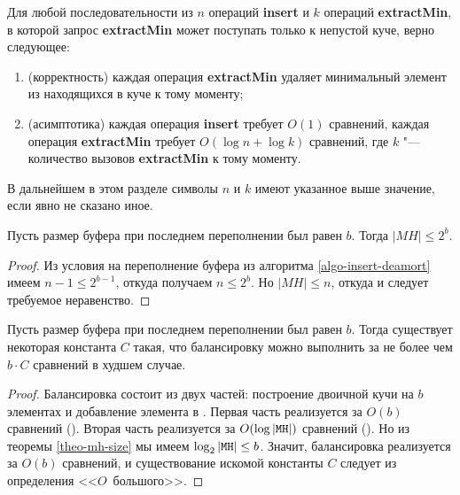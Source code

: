 \begin{theorem} \label{theo-fast-correct}
Для любой последовательности из
$n$ операций \textbf{insert} и $k$ операций \textbf{extractMin},
в которой запрос \textbf{extractMin} может поступать только к непустой
куче, верно следующее:
\begin{enumerate}
\item (корректность) каждая операция \textbf{extractMin} удаляет минимальный элемент
из находящихся в куче к тому моменту;
\item (асимптотика) каждая операция \textbf{insert} требует $O(1)$ сравнений,
каждая операция \textbf{extractMin} требует $O(\log n + \log k)$ сравнений,
где $k$ "--- количество вызовов \textbf{extractMin} к тому моменту.
\end{enumerate}
\end{theorem}

В дальнейшем в этом разделе символы $n$ и $k$ имеют указанное выше значение,
если явно не сказано иное.

\begin{lem} \label{theo-mh-size}
Пусть размер буфера при последнем переполнении был равен $b$. Тогда $|MH| \leq 2^b$.
\end{lem}
\begin{proof}
Из условия на переполнение буфера из алгоритма \ref{algo-insert-deamort} имеем
$n-1 \leq 2^{b-1}$, откуда получаем $n \leq 2^b$. Но $|MH| \leq n$, откуда
и следует требуемое неравенство.
\end{proof}

\begin{lem}\label{theo-balancing-constant}
Пусть размер буфера при последнем переполнении был равен $b$.
Тогда существует некоторая константа $C$ такая,
что балансировку можно выполнить за не более чем $b\cdot C$ сравнений в худшем случае.
\end{lem}
\begin{proof}
Балансировка состоит из двух частей: построение двоичной кучи на $b$ элементах
и добавление элемента в \MH. Первая часть реализуется за $O(b)$ сравнений (\cite{Cormen}).
Вторая часть реализуется за $O(\log |\texttt{MH}|)$ сравнений (\cite{Cormen}). Но из
теоремы \ref{theo-mh-size} мы имеем $\log_2 |\texttt{MH}| \leq b$. Значит, балансировка
реализуется за $O(b)$ сравнений, и существование искомой константы $C$ следует
из определения <<$O$~большого>>.
\end{proof}

